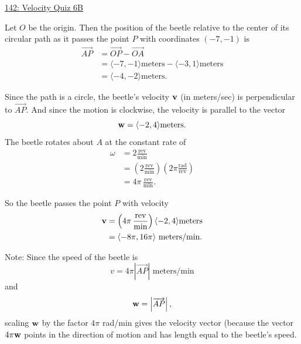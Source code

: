 \documentclass{ximera}
\begin{document}
\begin{explanation}

\begin{onlineOnly}
    \begin{center}
\end{center}
\end{onlineOnly}

\href{https://www.desmos.com/calculator/wkmticsxm7}{142: Velocity Quiz 6B}

Let $O$ be the origin. Then the position of the beetle relative to the center of its circular path as it passes the point $P$ with coordinates $(-7,-1)$ is
\begin{align*}
  \overrightarrow{AP} &= \overrightarrow{OP} - \overrightarrow{OA} \\
                                &= \langle  -7, -1  \rangle \text{meters} - \langle -3, 1  \rangle \text{meters} \\
                                &= \langle -4, -2 \rangle \text{meters}.
\end{align*}

Since the path is a circle, the beetle's velocity ${\bf v}$ (in meters/sec) is perpendicular to $\overrightarrow{AP}$. And since the motion is clockwise, the velocity is parallel to the vector
\[
  {\bf w} = \langle -2 ,  4\rangle \text{meters} .
\] 
The beetle rotates about $A$ at the constant rate of
\begin{align*}
    \omega &= 2 \frac{\text{rev}}{\text{min}} \\
                    &=  \left(  2 \frac{\text{rev}}{\text{min}} \right) \left(2\pi \frac{\text{rad}}{\text{rev}} \right) \\
                             &= 4\pi  \, \frac{\text{rev}}{\text{min}}.
\end{align*}

So the beetle passes the  point $P$ with velocity
\begin{align*}
       {\bf v} &= \left(  4\pi  \, \frac{\text{rev}}{\text{min}} \right) \langle  -2, 4\rangle \text{meters}  \\
                  &= \langle  -8\pi, 16\pi \rangle \text{ meters/min}.
\end{align*}

Note: Since the speed of the beetle is
\[
     v = 4\pi \left| \overrightarrow{AP}\right| \text{ meters/min}
\]
and
\[
      {\bf w} = \left| \overrightarrow{AP}\right|,
\]
scaling ${\bf w}$ by the factor $4\pi$ rad/min gives the velocity vector (because the vector $4\pi {\bf w}$ points in the direction of motion and has length equal to the beetle's speed.
\end{explanation}
\end{document}
